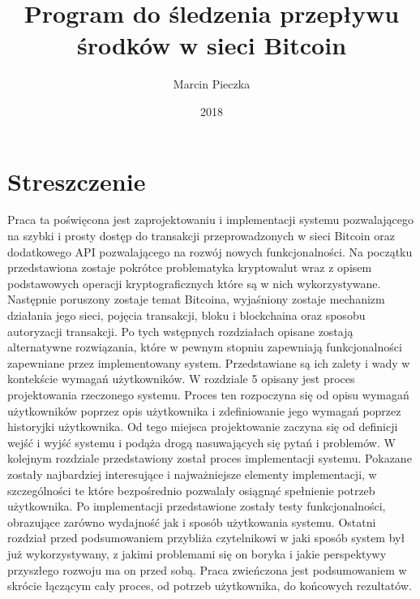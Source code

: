 \documentclass[12pt, en, eng, oneside]{mgr}
\begin{document}
\title{Program do śledzenia przepływu środków w sieci Bitcoin}
\date{2018}
\author{Marcin Pieczka}
\maketitle

\tableofcontents

\pagebreak 

\section*{Streszczenie}
Praca ta poświęcona jest zaprojektowaniu i implementacji systemu pozwalającego na szybki i prosty dostęp do transakcji przeprowadzonych w sieci Bitcoin oraz dodatkowego API pozwalającego na rozwój nowych funkcjonalności. Na początku przedstawiona zostaje pokrótce problematyka kryptowalut wraz z opisem podstawowych operacji kryptograficznych które są w nich wykorzystywane. Następnie poruszony zostaje temat Bitcoina, wyjaśniony zostaje mechanizm działania jego sieci, pojęcia transakcji, bloku i blockchaina oraz sposobu autoryzacji transakcji. Po tych wstępnych rozdziałach opisane zostają alternatywne rozwiązania, które w pewnym stopniu zapewniają funkcjonalności zapewniane przez implementowany system. Przedstawiane są ich zalety i wady w kontekście wymagań użytkowników. W rozdziale 5 opisany jest proces projektowania rzeczonego systemu. Proces ten rozpoczyna się od opisu wymagań użytkowników poprzez opis użytkownika i zdefiniowanie jego wymagań poprzez historyjki użytkownika. Od tego miejsca projektowanie zaczyna się od definicji wejść i wyjść systemu i podąża drogą nasuwających się pytań i problemów. W kolejnym rozdziale przedstawiony został proces implementacji systemu. Pokazane zostały najbardziej interesujące i najważniejsze elementy implementacji, w szczególności te które bezpośrednio pozwalały osiągnąć spełnienie potrzeb użytkownika. Po implementacji przedstawione zostały testy funkcjonalności, obrazujące zarówno wydajność jak i sposób użytkowania systemu. Ostatni rozdział przed podsumowaniem przybliża czytelnikowi w jaki sposób system był już wykorzystywany, z jakimi problemami się on boryka i jakie perspektywy przyszłego rozwoju ma on przed sobą. Praca zwieńczona jest podsumowaniem w skrócie łączącym cały proces, od potrzeb użytkownika, do końcowych rezultatów. 
\end{document}
